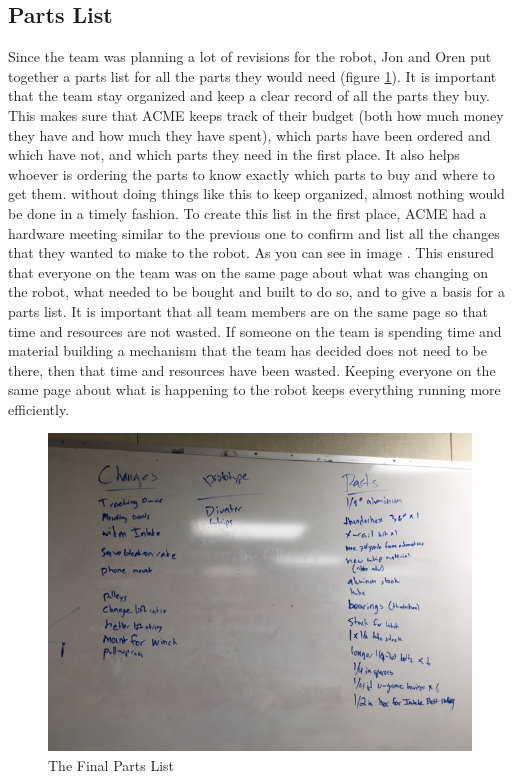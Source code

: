 \documentclass{article}
\begin{document}
\subsection{Parts List}
Since the team was planning a lot of revisions for the robot, Jon and Oren put together a parts list for all the parts they would need (figure \ref{fig: Parts list}). It is important that the team stay organized and keep a clear record of all the parts they buy. This makes sure that ACME keeps track of their budget (both how much money they have and how much they have spent), which parts have been ordered and which have not, and which parts they need in the first place. It also helps whoever is ordering the parts to know exactly which parts to buy and where to get them. without doing things like this to keep organized, almost nothing would be done in a timely fashion. To create this list in the first place, ACME had a hardware meeting similar to the previous one to confirm and list all the changes that they wanted to make to the robot. As you can see in image . This ensured that everyone on the team was on the same page about what was changing on the robot, what needed to be bought and built to do so, and to give a basis for a parts list. It is important that all team members are on the same page so that time and resources are not wasted. If someone on the team is spending time and material building a mechanism that the team has decided does not need to be there, then that time and resources have been wasted. Keeping everyone on the same page about what is happening to the robot keeps everything running more efficiently.

\begin{figure}
    \centering
    \includegraphics[width=.6 \textwidth]{14_12-03/images/IMG_0422.JPG}
    \caption{The Final Parts List}
    \label{fig: Parts list}
\end{figure}
\end{document}
